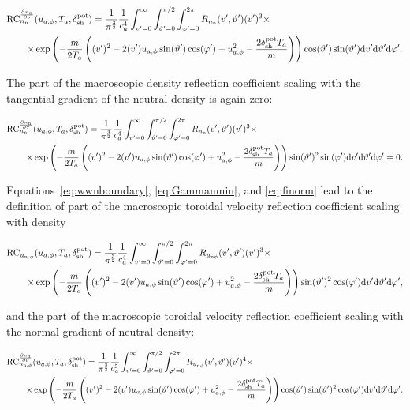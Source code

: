 \begin{align}
    \mathrm{RC}_{n_\mathrm{n}}^{\frac{\partial n_\mathrm{n}}{\partial \nu}} & (u_{a,\phi},T_a,\delta_{\mathrm{sh}}^{\mathrm{pot}}) =
    \frac{1}{\pi^\frac{3}{2}} \frac{1}{c_a^4} \int_{v'=0}^{\infty} \int_{\vartheta'=0}^{\pi/2} \int_{\varphi'=0}^{2\pi}
    R_{n_{\mathrm{n}}}(v',\vartheta') (v')^3 \times \nonumber \\
    \times & \exp \left( - \frac{m}{2 T_a} \left( (v')^2-2 (v') u_{a,\phi} \sin (\vartheta') \cos (\varphi') + u_{a,\phi}^2 - \frac{2 \delta_{\mathrm{sh}}^{\mathrm{pot}} T_a}{m} \right) \right) \cos (\vartheta') \sin (\vartheta')
    \mathrm{d} v' \mathrm{d} \vartheta' \mathrm{d} \varphi'. \label{eq:rptwotwo_def}
\end{align}

\noindent The part of the macroscopic density reflection coefficient scaling with the tangential gradient of the neutral density is again zero:

\begin{align}
    \mathrm{RC}_{n_{\mathrm{n}}}^{\frac{\partial n_\mathrm{n}}{\partial \tau}} & (u_{a,\phi},T_a,\delta_{\mathrm{sh}}^{\mathrm{pot}}) =
    \frac{1}{\pi^\frac{3}{2}} \frac{1}{c_a^4} \int_{v'=0}^{\infty} \int_{\vartheta'=0}^{\pi/2} \int_{\varphi'=0}^{2\pi}
    R_{n_{\mathrm{n}}}(v',\vartheta') (v')^3 \times \nonumber \\
    \times & \exp \left( - \frac{m}{2 T_a} \left( (v')^2-2 (v') u_{a,\phi} \sin (\vartheta') \cos (\varphi') + u_{a,\phi}^2 - \frac{2 \delta_{\mathrm{sh}}^{\mathrm{pot}} T_a}{m} \right) \right) \sin (\vartheta')^2 \sin (\varphi')
    \mathrm{d} v' \mathrm{d} \vartheta' \mathrm{d} \varphi' = 0.
\end{align}

\noindent Equations~\eqref{eq:wwnboundary}, \eqref{eq:Gammanmin}, and \eqref{eq:finorm} lead to the definition of part of the macroscopic toroidal velocity reflection coefficient scaling with density

\begin{align}
    \mathrm{RC}_{u_{\mathrm{n},\phi}} & (u_{a,\phi},T_a,\delta_{\mathrm{sh}}^{\mathrm{pot}}) =
    \frac{1}{\pi^\frac{3}{2}} \frac{1}{c_a^4} \int_{v'=0}^{\infty} \int_{\vartheta'=0}^{\pi/2} \int_{\varphi'=0}^{2\pi}
    R_{u_{\mathrm{n}\phi}}(v',\vartheta') (v')^3 \times \nonumber \\
    \times & \exp \left( - \frac{m}{2 T_a} \left( (v')^2-2 (v') u_{a,\phi} \sin (\vartheta') \cos (\varphi') + u_{a,\phi}^2 - \frac{2 \delta_{\mathrm{sh}}^{\mathrm{pot}} T_a}{m} \right) \right) \sin (\vartheta')^2 \cos (\varphi')
    \mathrm{d} v' \mathrm{d} \vartheta' \mathrm{d} \varphi', \label{eq:rpthreeonei_def}
\end{align}

\noindent and the part of the macroscopic toroidal velocity reflection coefficient scaling with the normal gradient of neutral density:

\begin{align}
    \mathrm{RC}_{u_{\mathrm{n},\phi}}^{\frac{\partial n_\mathrm{n}}{\partial \nu}} & (u_{a,\phi},T_a,\delta_{\mathrm{sh}}^{\mathrm{pot}}) =
    \frac{1}{\pi^\frac{3}{2}} \frac{1}{c_a^5} \int_{v'=0}^{\infty} \int_{\vartheta'=0}^{\pi/2} \int_{\varphi'=0}^{2\pi}
    R_{u_{\mathrm{n}\phi}}(v',\vartheta') (v')^4 \times \nonumber \\
    \times & \exp \left( - \frac{m}{2 T_a} \left( (v')^2-2 (v') u_{a,\phi} \sin (\vartheta') \cos (\varphi') + u_{a,\phi}^2 - \frac{2 \delta_{\mathrm{sh}}^{\mathrm{pot}} T_a}{m} \right) \right) \cos (\vartheta') \sin (\vartheta')^2 \cos (\varphi')
    \mathrm{d} v' \mathrm{d} \vartheta' \mathrm{d} \varphi'. \label{eq:rpthreetwo_def}
\end{align}

